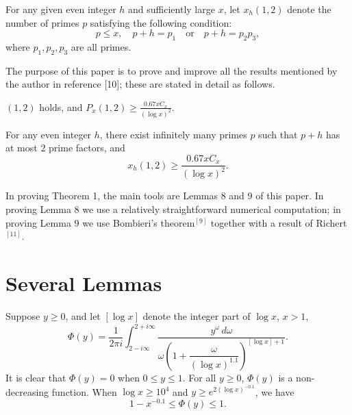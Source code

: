 For any given even integer $h$ and sufficiently large $x$, let $x_h(1,2)$ denote the number of primes $p$ satisfying the following condition:
\[
p\leqslant x,\quad p+h=p_1 \quad \text{or} \quad p+h=p_2p_3,
\]
where $p_1,p_2,p_3$ are all primes.

The purpose of this paper is to prove and improve all the results mentioned by the author in reference [10]; these are stated in detail as follows.

\begin{theorem}
$(1,2)$ holds, and $\displaystyle P_x(1,2)\geqslant\frac{0.67xC_x}{(\log x)^2}$.
\end{theorem}

\begin{theorem}
For any even integer $h$, there exist infinitely many primes $p$ such that $p+h$ has at most $2$ prime factors, and
\[
x_h(1,2)\geqslant\frac{0.67xC_x}{(\log x)^2}.
\]
\end{theorem}

In proving Theorem 1, the main tools are Lemmas 8 and 9 of this paper. In proving Lemma 8 we use a relatively straightforward numerical computation; in proving Lemma 9 we use Bombieri's theorem$^{[9]}$ together with a result of Richert$^{[11]}$.

\section{Several Lemmas}

\begin{lemma}
Suppose $y\geqslant0$, and let $[\log x]$ denote the integer part of $\log x$, $x>1$,
\[
\Phi(y)=\frac{1}{2\pi i}\int_{2-i\infty}^{2+i\infty}\frac{y^\omega\,d\omega}{\omega\left(1+\dfrac{\omega}{(\log x)^{1.1}}\right)^{[\log x]+1}}.
\]
It is clear that $\Phi(y)=0$ when $0\leqslant y\leqslant1$. For all $y\geqslant0$, $\Phi(y)$ is a non-decreasing function. When $\log x\geqslant10^4$ and $y\geqslant e^{2(\log x)^{-0.1}}$, we have
\[
1-x^{-0.1}\leqslant\Phi(y)\leqslant1.
\]
\end{lemma}

